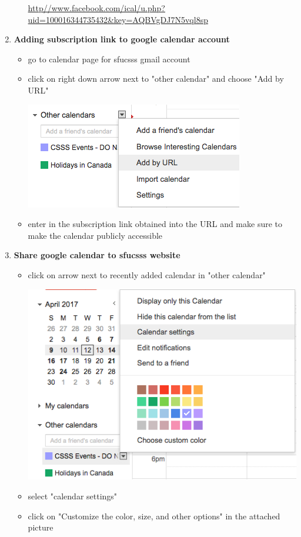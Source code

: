 \documentclass{article}
\begin{document}
\begin{enumerate}
\begin{itemize}
		\url{http//www.facebook.com/ical/u.php?uid=100016344735432&key=AQBVgDJ7N5vql8sp}
	\end{itemize}
	\item \textbf{Adding subscription link to google calendar account}
	\begin{itemize}
		\item go to calendar page for sfucsss gmail account
		\item click on right down arrow next to "other calendar" and choose "Add by URL"
		
		\includegraphics[scale=0.45]{picture3.png}
		\item enter in the subscription link obtained into the URL and make sure to make the calendar publicly accessible
	\end{itemize}
	\item \textbf{Share google calendar to sfucsss website}
	\begin{itemize}
		\item click on arrow next to recently added calendar in "other calendar"
		
		\includegraphics[scale=0.45]{picture4.png}
		\item select "calendar settings"
		\item click on "Customize the color, size, and other options" in the attached picture
		

\end{itemize}
\end{enumerate}
\end{document}
